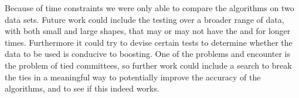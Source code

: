 \par Because of time constraints we were only able to compare the algorithms on two data sets. Future work could include the testing over a broader range of data, with both small and large shapes, that may or may not have the  and for longer times. Furthermore it could try to devise certain tests to determine whether the data to be used is conducive to boosting. One of the problems \squintB and \NHB encounter is the problem of tied committees, so further work could include a search to break the ties in a meaningful way to potentially improve the accuracy of the algorithms, and to see if this indeed works. 
